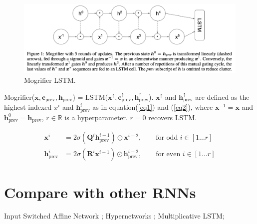 \begin{figure}[ht]
  \centering
  \includegraphics[scale=0.4]{images/MogrifierLSTM.png}
  \caption{Mogrifier LSTM.}
  \label{fig1}
\end{figure}

Mogrifier($\boldsymbol{x}, \boldsymbol{c}_{\text{prev}}, \boldsymbol{h}_{\text{prev}}$) =
LSTM($\boldsymbol{x}^\uparrow, \boldsymbol{c}_{\text{prev}}^{\uparrow}, \boldsymbol{h}_{\text{prev}}^{\uparrow}$).
$\boldsymbol{x}^\uparrow$ and $\boldsymbol{h}_{\text{prev}}^{\uparrow}$ are
defined as the highest indexed $x^i$ and $\boldsymbol{h}^{i}_{\text{prev}}$ as
in equation(\ref{eq1}) and (\ref{eq2}), where $\boldsymbol{x}^{-1} = \boldsymbol{x}$
and $\boldsymbol{h}_{\text{prev}}^{0} = \boldsymbol{h}_{\text{prev}}$, $r \in \mathbb{R}$
is a hyperparameter. $r = 0$ recovers LSTM.

\begin{eqnarray}
\boldsymbol{x}^i &= 2\sigma(\boldsymbol{Q}^i\boldsymbol{h}_{\text{prev}}^{i-1})
\odot \boldsymbol{x}^{i-2}, \qquad \text{for odd  } i \in [1\dotsc r] \label{eq1}\\
\boldsymbol{h}^i_{\text{prev}} &= 2\sigma(\boldsymbol{R}^i\boldsymbol{x}^{i-1})
\odot \boldsymbol{h}^{i-2}_{\text{prev}}, \qquad \text{for even  } i \in [1\dotsc r] \label{eq2}
\end{eqnarray}

\section{Compare with other RNNs}

Input Switched Affine Network \cite{foerster2017input};
Hypernetworks \cite{ha2016hypernetworks};
Multiplicative LSTM\cite{krause2016multiplicative};

